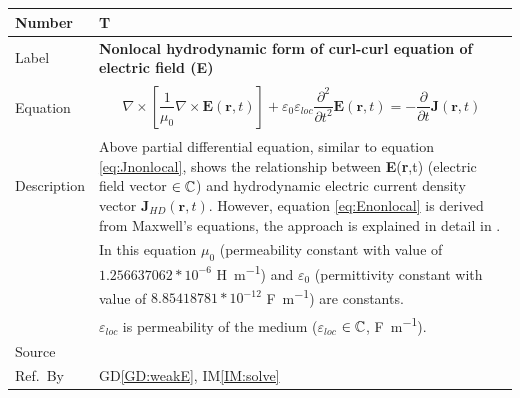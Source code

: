 \documentclass[12pt]{article}
\newcommand{\colAwidth}{0.13\textwidth}
\newcommand{\colBwidth}{0.82\textwidth}
\newcounter{theorynum} %
\begin{document}
~\newline

~\newline

\noindent
\begin{minipage}{\textwidth}
	\renewcommand*{\arraystretch}{1.5}
	\begin{tabular}{| p{\colAwidth} | p{\colBwidth}|}
		\hline
		\rowcolor[gray]{0.9}
		Number& T{theorynum}\thetheorynum \label{TM:E}\\
		\hline
		Label&\bf Nonlocal hydrodynamic form of curl-curl equation of electric field (\textbf{E}) \\
		\hline
		Equation&  
		\begin{equation}
			\label{eq:Enonlocal}
			\begin{gathered}
							\nabla\times[\dfrac{1}{\mu_{0}}\nabla\times \textbf{E}(\textbf{r},t)] + \varepsilon_{0}\varepsilon_{loc}\dfrac{\partial^{2}}{\partial t^{2}}\textbf{E}(\textbf{r},t) = -\dfrac{\partial}{\partial t}\textbf{J}(\textbf{r},t)
			\end{gathered}  \end{equation} \\
		
		
		\hline
		Description & 
		Above partial differential equation, similar to equation \ref{eq:Jnonlocal}, shows the relationship between \textbf{E}(\textbf{r},t) (electric field vector $\in \Bbb C$) and hydrodynamic electric current density vector $\textbf{J}_{HD}(\textbf{r},t)$. However, equation \ref{eq:Enonlocal} is derived from  Maxwell's equations, the approach is explained in detail in \cite{hiremath2012numerical}. \\
		& In this equation $\mu_{0}$ (permeability constant with value of $1.256637062 * 10^{-6}$ \si{\henry \per \meter}) and $\varepsilon_{0}$ (permittivity constant with value of $8.85418781*10^{-12}$ \si{\farad \per \meter}) are constants.
		\\
		&$\varepsilon_{loc}$ is permeability of the medium ($\varepsilon_{loc}$ $\in \Bbb C$, \si{\farad \per \meter}).    
		\\
		\hline
		Source & 
		\cite{hiremath2012numerical} \\
		\hline
		Ref.\ By & GD\ref{GD:weakE}, IM\ref{IM:solve}\\
		\hline
	\end{tabular}
\end{minipage}\\
\end{document}
